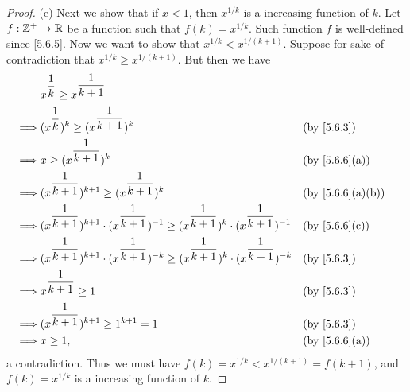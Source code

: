 \begin{proof}{(e)}
  Next we show that if \(x < 1\), then \(x^{1 / k}\) is a increasing function of \(k\).
  Let \(f : \mathbb{Z}^+ \to \mathbb{R}\) be a function such that \(f(k) = x^{1 / k}\).
  Such function \(f\) is well-defined since \cref{5.6.5}.
  Now we want to show that \(x^{1 / k} < x^{1 / (k + 1)}\).
  Suppose for sake of contradiction that \(x^{1 / k} \geq x^{1 / (k + 1)}\).
  But then we have
  \begin{align*}
             & x^{\dfrac{1}{k}} \geq x^{\dfrac{1}{k + 1}}                                                                                                            \\
    \implies & (x^{\dfrac{1}{k}})^k \geq (x^{\dfrac{1}{k + 1}})^k                                                                               &  & \by{5.6.3}      \\
    \implies & x \geq (x^{\dfrac{1}{k + 1}})^k                                                                                                  &  & \by{5.6.6}[a]   \\
    \implies & (x^{\dfrac{1}{k + 1}})^{k + 1} \geq (x^{\dfrac{1}{k + 1}})^k                                                                     &  & \by{5.6.6}[a,b] \\
    \implies & (x^{\dfrac{1}{k + 1}})^{k + 1} \cdot (x^{\dfrac{1}{k + 1}})^{-1} \geq (x^{\dfrac{1}{k + 1}})^k \cdot (x^{\dfrac{1}{k + 1}})^{-1} &  & \by{5.6.6}[c]   \\
    \implies & (x^{\dfrac{1}{k + 1}})^{k + 1} \cdot (x^{\dfrac{1}{k + 1}})^{-k} \geq (x^{\dfrac{1}{k + 1}})^k \cdot (x^{\dfrac{1}{k + 1}})^{-k} &  & \by{5.6.3}      \\
    \implies & x^{\dfrac{1}{k + 1}} \geq 1                                                                                                      &  & \by{5.6.3}      \\
    \implies & (x^{\dfrac{1}{k + 1}})^{k + 1} \geq 1^{k + 1} = 1                                                                                &  & \by{5.6.3}      \\
    \implies & x \geq 1,                                                                                                                        &  & \by{5.6.6}[a]
  \end{align*}
  a contradiction.
  Thus we must have \(f(k) = x^{1 / k} < x^{1 / (k + 1)} = f(k + 1)\), and \(f(k) = x^{1 / k}\) is a increasing function of \(k\).


\end{proof}
